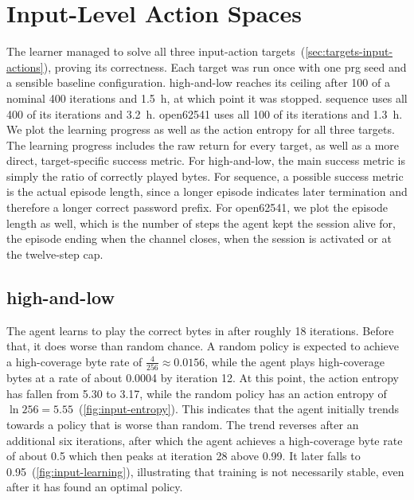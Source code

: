
\section{Input-Level Action Spaces}\label{sec:results-input-actions}

The learner managed to solve all three input-action targets~(\cref{sec:targets-input-actions}), proving its correctness.
Each target was run once with one \gls{prg} seed and a sensible baseline configuration.
high-and-low reaches its ceiling after 100 of a nominal 400 iterations and \SI{1.5}{\hour}, at
which point it was stopped.
sequence uses all 400 of its iterations and \SI{3.2}{\hour}.
open62541 uses all 100 of its iterations and \SI{1.3}{\hour}.
We plot the learning progress as well as the action entropy for all three targets.
The learning progress includes the raw return for every target, as well as a
more direct, target-specific success metric.
For high-and-low, the main success metric is simply the ratio of correctly played bytes.
For sequence, a possible success metric is the actual episode length, since a longer
episode indicates later termination and therefore a longer correct password prefix.
For open62541, we plot the episode length as well, which is the number of steps the agent
kept the session alive for, the episode ending when the channel closes, when the session
is activated or at the twelve-step cap.




\subsection{high-and-low}\label{sec:results-high-and-low}

The agent learns to play the correct bytes in \code{[A-D]} after roughly 18 iterations.
Before that, it does worse than random chance.
A random policy is expected to achieve a high-coverage byte rate of $\frac{4}{256}\approx 0.0156$,
while the agent plays high-coverage bytes at a rate of about \num{0.0004} by iteration 12.
At this point, the action entropy has fallen from \num{5.30} to \num{3.17},
while the random policy has an action entropy of $\ln 256 = \num{5.55}$~(\cref{fig:input-entropy}).
This indicates that the agent initially trends towards a policy that is worse than random.
The trend reverses after an additional six iterations, after which the agent achieves a
high-coverage byte rate of about \num{0.5} which then peaks at iteration 28 above \num{0.99}.
It later falls to \num{0.95}~(\cref{fig:input-learning}), illustrating that training
is not necessarily stable, even after it has found an optimal policy.

